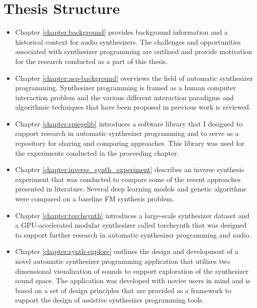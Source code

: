 \section{Thesis Structure}
\begin{itemize}
    \item Chapter \ref{chapter:background} provides background information and a historical context for audio synthesizers. The challenges and opportunities associated with synthesizer programming are outlined and provide motivation for the research conducted as a part of this thesis.
    \item Chapter \ref{chapter:asp-background} overviews the field of automatic synthesizer programming. Synthesizer programming is framed as a human computer interaction problem and the various different interaction paradigms and algorithmic techniques that have been proposed in previous work is reviewed.
    \item Chapter \ref{chapter:spiegelib} introduces a software library that I designed to support research in automatic synthesizer programming and to serve as a repository for sharing and comparing approaches. This library was used for the experiments conducted in the proceeding chapter.
    \item Chapter \ref{chapter:inverse_synth_experiment} describes an inverse synthesis experiment that was conducted to compare some of the recent approaches presented in literature. Several deep learning models and genetic algorithms were compared on a baseline FM synthesis problem.
    \item Chapter \ref{chapter:torchsynth} introduces a large-scale synthesizer dataset and a GPU-accelerated modular synthesizer called torchsynth that was designed to support further research in automatic synthesizer programming and audio.
    \item Chapter \ref{chapter:synth-explore} outlines the design and development of a novel automatic synthesizer programming application that utilizes two dimensional visualization of sounds to support exploration of the synthesizer sound space. The application was developed with novice users in mind and is based on a set of design principles that are provided as a framework to support the design of assistive synthesizer programming tools.
    
\end{itemize}


